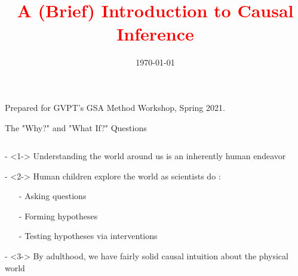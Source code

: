 \documentclass[notes,11pt, aspectratio=169, usenames, dvipsnames]{beamer}
\title[]{\textcolor{red}{A (Brief) Introduction to Causal Inference}}
\author[EAJ]{}
\institute[UMDCP]{\small{\begin{tabular}{c c c}
\multicolumn{3}{c}{Evan A. Jones} \\
\multicolumn{3}{c}{University of Maryland -- College Park}


\end{tabular}}}
\date{\today}
\newenvironment{wideitemize}{\itemize\addtolength{\itemsep}{10pt}}{\enditemize}
\begin{document}
\begin{frame}
\maketitle
  \centering Prepared for GVPT's GSA Method Workshop, Spring 2021.
\end{frame}

\begin{frame}{The "Why?" and "What If?" Questions}
	\begin{columns}[T] %
		\begin{column}{.58\textwidth}
			\begin{wideitemize}
				\item[-]<1-> Understanding the world around us is an inherently human endeavor
				\item[-]<2-> Human children explore the world as scientists do \citep{Gopnik2012, BuchsbaumEtal2012}: 
					\begin{itemize}
						\item[-] Asking questions
						\item[-] Forming hypotheses
						\item[-] Testing hypotheses via interventions \citep{GopnikEtal2004}
					\end{itemize}
				\item[-]<3-> By adulthood, we have fairly solid causal intuition about the physical world
			\end{wideitemize}
		\end{column}%
		\hfill%
		\begin{column}{.38\textwidth}
\end{column}
\end{columns}
\end{frame}
\end{document}
